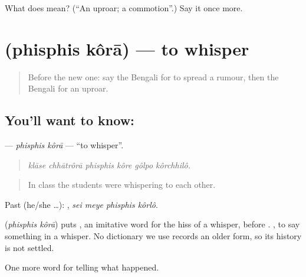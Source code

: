 \begin{tcolorbox}[breakable,colback=teal!4,colframe=teal!35!black,title={Before you move on}]
What does  mean? (\textquotedblleft{}An uproar; a commotion\textquotedblright{}.) Say it once more.
\end{tcolorbox}
\section[\texorpdfstring{\bn{ফিসফিস} \bn{করা} (phisphis kôrā)}{ফিসফিস করা (phisphis kôrā)}]{  (phisphis kôrā) — to whisper}

\label{lesson:BN-C298-phisphis-kora}



\begin{quote}
Before the new one: say the Bengali for to spread a rumour, then the Bengali for an uproar.
\end{quote}

\subsection*{You'll want to know:  }
\textbf{ } — \emph{phisphis kôrā} — \textquotedblleft{}to whisper\textquotedblright{}.

\begin{quote}
     
\end{quote}

\begin{quote}
\emph{klāse chhātrôrā phisphis kôre gôlpo kôrchhilô.}
\end{quote}

\begin{quote}
In class the students were whispering to each other.
\end{quote}

Past (he/she …):    , \emph{sei meye phisphis kôrlô}.

\begin{cousinweb}
\textbf{ } (\emph{phisphis kôrā}) puts , an imitative word for the hiss of a whisper, before .   , to say something in a whisper. No dictionary we use records an older form, so its history is not settled.
\end{cousinweb}

\begin{grammarlens}[title={What you've built}]
One more word for telling what happened.
\end{grammarlens}

